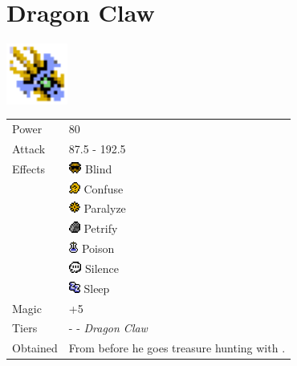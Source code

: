 \section{Dragon Claw}
\label{weapon:dragon_claw}

\includegraphics[height=2cm,keepaspectratio]{./resources/weapons/dragonclaw}

\begin{longtable}{ l p{9cm} }
	Power
	& 80
\\ %
	Attack
	& 87.5 - 192.5
\\ %
	Effects
	& \includegraphics[height=1em,keepaspectratio]{./resources/effects/blind}
	Blind \\
	& \includegraphics[height=1em,keepaspectratio]{./resources/effects/confusion}
	Confuse \\
	& \includegraphics[height=1em,keepaspectratio]{./resources/effects/paralyze}
	Paralyze \\
	& \includegraphics[height=1em,keepaspectratio]{./resources/effects/petrify}
	Petrify \\
	& \includegraphics[height=1em,keepaspectratio]{./resources/effects/poison}
	Poison \\
	& \includegraphics[height=1em,keepaspectratio]{./resources/effects/silence}
	Silence \\
	& \includegraphics[height=1em,keepaspectratio]{./resources/effects/sleep}
	Sleep
\\ %
	Magic
	& +5
\\ %
	Tiers
	& \nameref{weapon:cat_claw} - \nameref{weapon:charm_claw} - \textit{Dragon Claw}
\\ %
	Obtained
	& From \nameref{char:tristam} before he goes treasure hunting with \nameref{char:spencer}.
\end{longtable}
